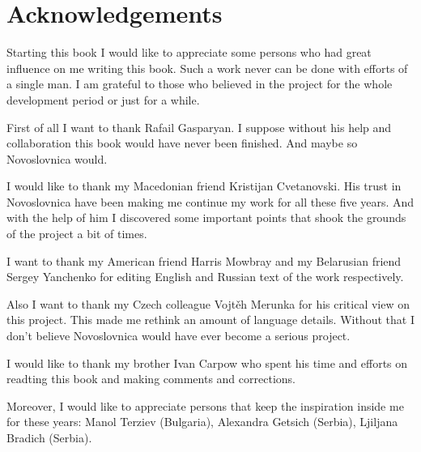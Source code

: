 \chapter{Acknowledgements}

Starting this book I would like to appreciate some persons who had great influence on me writing this book. Such a work never can be done with efforts of a single man. I am grateful to those who believed in the project for the whole development period or just for a while.

First of all I want to thank Rafail Gasparyan. I suppose without his help and collaboration this book would have never been finished. And maybe so Novoslovnica would.

I would like to thank my Macedonian friend Kristijan Cvetanovski. His trust in Novoslovnica have been making me continue my work for all these five years. And with the help of him I discovered some important points that shook the grounds of the project a bit of times.

I want to thank my American friend Harris Mowbray and my Belarusian friend Sergey Yanchenko for editing English and Russian text of the work respectively.

Also I want to thank my Czech colleague Vojtěh Merunka for his critical view on this project. This made me rethink an amount of language details. Without that I don't believe Novoslovnica would have ever become a serious project. 

I would like to thank my brother Ivan Carpow who spent his time and efforts on readting this book and making comments and corrections.

Moreover, I would like to appreciate persons that keep the inspiration inside me for these years: Manol Terziev (Bulgaria), Alexandra Getsich (Serbia), Ljiljana Bradich (Serbia).
